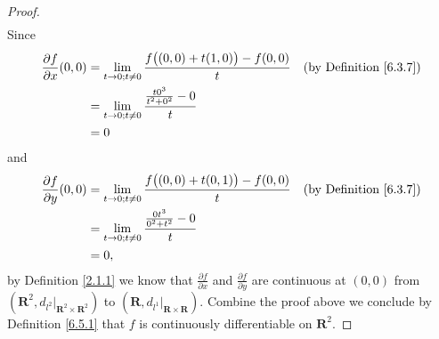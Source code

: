 \begin{proof}
\begin{align*}
    \end{align*}
    Since
    \begin{align*}
        \frac{\partial f}{\partial x}(0, 0) & = \lim_{t \to 0 ; t \neq 0} \frac{f\big((0, 0) + t(1, 0)\big) - f(0, 0)}{t} & \text{(by Definition \ref{6.3.7})} \\
                                            & = \lim_{t \to 0 ; t \neq 0} \frac{\frac{t 0^3}{t^2 + 0^2} - 0}{t}                                                \\
                                            & = 0
    \end{align*}
    and
    \begin{align*}
        \frac{\partial f}{\partial y}(0, 0) & = \lim_{t \to 0 ; t \neq 0} \frac{f\big((0, 0) + t(0, 1)\big) - f(0, 0)}{t} & \text{(by Definition \ref{6.3.7})} \\
                                            & = \lim_{t \to 0 ; t \neq 0} \frac{\frac{0 t^3}{0^2 + t^2} - 0}{t}                                                \\
                                            & = 0,
    \end{align*}
    by Definition \ref{2.1.1} we know that \(\frac{\partial f}{\partial x}\) and \(\frac{\partial f}{\partial y}\) are continuous at \((0, 0)\) from \((\mathbf{R}^2, d_{l^2}|_{\mathbf{R}^2 \times \mathbf{R}^2})\) to \((\mathbf{R}, d_{l^1}|_{\mathbf{R} \times \mathbf{R}})\).
    Combine the proof above we conclude by Definition \ref{6.5.1} that \(f\) is continuously differentiable on \(\mathbf{R}^2\).


\end{proof}
